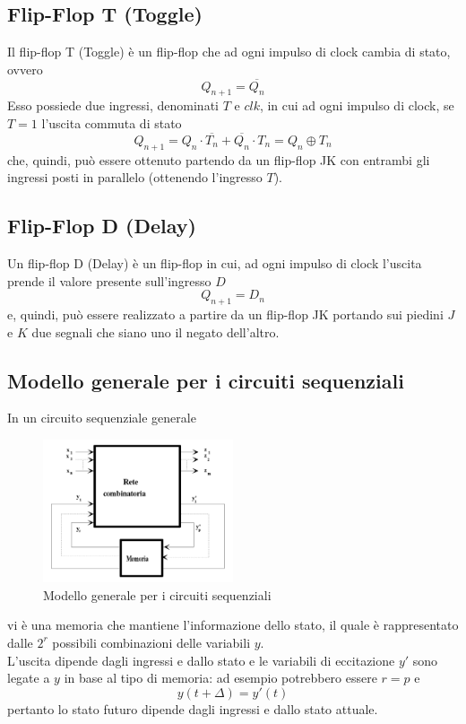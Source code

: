 \documentclass[a4paper]{extarticle}
\begin{document}
\vspace{1em}
\subsection{Flip-Flop T (Toggle)}
Il flip-flop T (Toggle) è un flip-flop che ad ogni impulso di clock cambia di stato, ovvero
\[Q_{n+1} = \overline{Q_n}\]
Esso possiede due ingressi, denominati $T$ e $clk$, in cui ad ogni impulso di clock, se $T=1$ l'uscita commuta di stato
\[Q_{n+1} = Q_n \cdot \overline{T_n} + \overline{Q_n} \cdot T_n = Q_n \oplus T_n\]
che, quindi, può essere ottenuto partendo da un flip-flop JK con entrambi gli ingressi posti in parallelo (ottenendo l'ingresso $T$).

\vspace{1em}
\subsection{Flip-Flop D (Delay)}
Un flip-flop D (Delay) è un flip-flop in cui, ad ogni impulso di clock l'uscita prende il valore presente sull'ingresso $D$
\[Q_{n+1}=D_n\]
e, quindi, può essere realizzato a partire da un flip-flop JK portando sui piedini $J$ e $K$ due segnali che siano uno il negato dell'altro.

\newpage
\noindent
\subsection{Modello generale per i circuiti sequenziali}
In un circuito sequenziale generale 

\begin{figure}[H]
    \centering
    \includegraphics[width=0.5\textwidth]{modello-generale-circuiti-sequenziali.png}
    \caption{Modello generale per i circuiti sequenziali}
    \label{fig:modello_generale_circuiti_sequenziali}
\end{figure}

\noindent
vi è una memoria che mantiene l'informazione dello stato, il quale è rappresentato dalle $2^r$ possibili combinazioni delle variabili $y$.\\
L'uscita dipende dagli ingressi e dallo stato e le variabili di eccitazione $y'$ sono legate a $y$ in base al tipo di memoria: ad esempio potrebbero essere $r=p$ e
\[y(t+\Delta)=y'(t)\]
pertanto lo stato futuro dipende dagli ingressi e dallo stato attuale.
\end{document}
